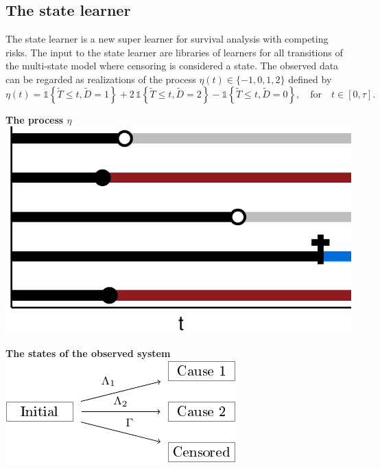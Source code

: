 \documentclass[a0,portrait]{a0poster}
\newcommand{\1}{\mathds{1}}
\begin{document}
\begin{minipage}{\textwidth}
\begin{minipage}[t]{1\linewidth}
\begin{multicols}{2}
\section*{The state learner}

The state learner is a new super learner for survival analysis with
competing risks. The input to the state learner are libraries of
learners for all transitions of the multi-state model where censoring
is considered a state. The observed data can be regarded as
realizations of the process \( \eta(t) \in \{-1, 0, 1,2\} \) defined
by
\begin{equation*}
  \eta(t) = \1{
    \left\{
      \tilde{T} \leq t, \tilde D=1
    \right\}} + 2\,\1{\left\{\tilde{T} \leq t, \tilde
      D=2\right\}} - \1{\left\{\tilde{T} \leq t, \tilde D=0\right\}},
  \quad \text{for} \quad t \in [0, \tau].
\end{equation*}

\begin{minipage}[t]{0.5\linewidth}
  \begin{center}
    \textbf{The process \( \eta \)} \\[1em]
    \includegraphics[width=0.8\linewidth]{multi-state-data-3.pdf}
\end{center}
\end{minipage}
\begin{minipage}[t]{.5\linewidth}
  \begin{center}
    \textbf{The states of the observed system} \\[1em]
    \includegraphics[width=.9\linewidth]{comp-risk-observed-w-text.pdf}
\end{center}
\end{minipage}


\end{multicols}
\end{minipage}
\end{minipage}
\end{document}
